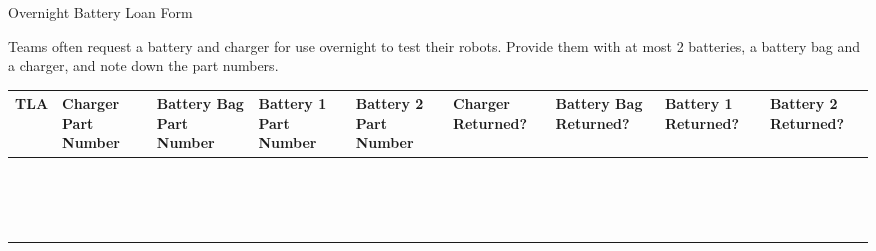 \documentclass[a4paper, 12pt, landscape]{article}
\begin{document}
\begin{center}

    {\huge{Overnight Battery Loan Form}}

\end{center}

Teams often request a battery and charger for use overnight to test their robots. Provide them with at most 2 batteries, a battery bag and a charger, and note down the part numbers.

\begin{center}
\begin{table}[h]
\def\arraystretch{1.5}
\begin{tabularx}{\textwidth}{|Y|Y|Y|Y|Y|Y|Y|Y|Y|}
    \textbf{TLA} & \textbf{Charger Part Number} & \textbf{Battery Bag Part Number} & \textbf{Battery 1 Part Number} & \textbf {Battery 2 Part Number} & \textbf{Charger Returned?} & \textbf{Battery Bag Returned?} & \textbf{Battery 1 Returned?} & \textbf{Battery 2 Returned?} \\
\hline
\large
& & & & & & & & \\ \hline
& & & & & & & & \\ \hline
& & & & & & & & \\ \hline
& & & & & & & & \\ \hline
& & & & & & & & \\ \hline
& & & & & & & & \\ \hline
& & & & & & & & \\ \hline
& & & & & & & & \\ \hline
& & & & & & & & \\ \hline
& & & & & & & & \\ \hline
& & & & & & & & \\ \hline
& & & & & & & & \\ \hline
& & & & & & & & \\ \hline
& & & & & & & & \\ \hline
& & & & & & & & \\ \hline
& & & & & & & & \\ \hline
\end{tabularx}
\end{table}
\end{center}
\end{document}

